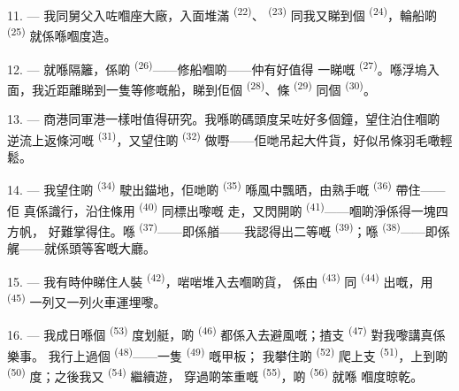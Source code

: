 \VUsaut{3.0mm}
\VUsaut{3.0mm}

11. --- 我同舅父入咗嗰座大廠，入面堆滿 \textsuperscript{(22)}、
 \textsuperscript{(23)} 同我又睇到個
\textsuperscript{(24)}，輪船啲 \textsuperscript{(25)} 就係喺嗰度造。

12. --- 就喺隔籬，係啲 \textsuperscript{(26)}——修船嗰啲——仲有好值得
一睇嘅 \textsuperscript{(27)}。喺浮塢入面，我近距離睇到一隻等修嘅船，睇到佢個
 \textsuperscript{(28)}、條 \textsuperscript{(29)} 同個
\textsuperscript{(30)}。

13. --- 商港同軍港一樣咁值得研究。我喺啲碼頭度呆咗好多個鐘，望住泊住嗰啲
逆流上返條河嘅 \textsuperscript{(31)}，又望住啲
\textsuperscript{(32)} 做嘢——佢哋吊起大件貨，好似吊條羽毛噉輕鬆。

\VUsaut{4.0mm}
\VUsaut{3.0mm}

14. --- 我望住啲 \textsuperscript{(34)} 駛出錨地，佢哋啲
\textsuperscript{(35)} 喺風中飄晒，由熟手嘅 \textsuperscript{(36)} 帶住——佢
真係識行，沿住條用 \textsuperscript{(40)} 同標出嚟嘅
走，又閃開啲 \textsuperscript{(41)}——嗰啲淨係得一塊四方帆，
好難掌得住。喺 \textsuperscript{(37)}——即係艏——我認得出二等嘅
\textsuperscript{(39)}；喺 \textsuperscript{(38)}——即係艉——就係頭等客嘅大廳。

15. --- 我有時仲睇住人裝 \textsuperscript{(42)}，啱啱堆入去嗰啲貨，
係由 \textsuperscript{(43)} 同 \textsuperscript{(44)} 出嘅，用
 \textsuperscript{(45)} 一列又一列火車運埋嚟。

\VUsaut{3.0mm}
\VUsaut{3.0mm}

16. --- 我成日喺個 \textsuperscript{(53)} 度划艇，啲
\textsuperscript{(46)} 都係入去避風嘅；揸支 \textsuperscript{(47)} 對我嚟講真係樂事。
我行上過個 \textsuperscript{(48)}——一隻 \textsuperscript{(49)} 嘅甲板；
我攀住啲 \textsuperscript{(52)} 爬上支 \textsuperscript{(51)}，上到啲
 \textsuperscript{(50)} 度；之後我又 \textsuperscript{(54)} 繼續遊，
穿過啲笨重嘅 \textsuperscript{(55)}，啲 \textsuperscript{(56)} 就喺
嗰度晾乾。

